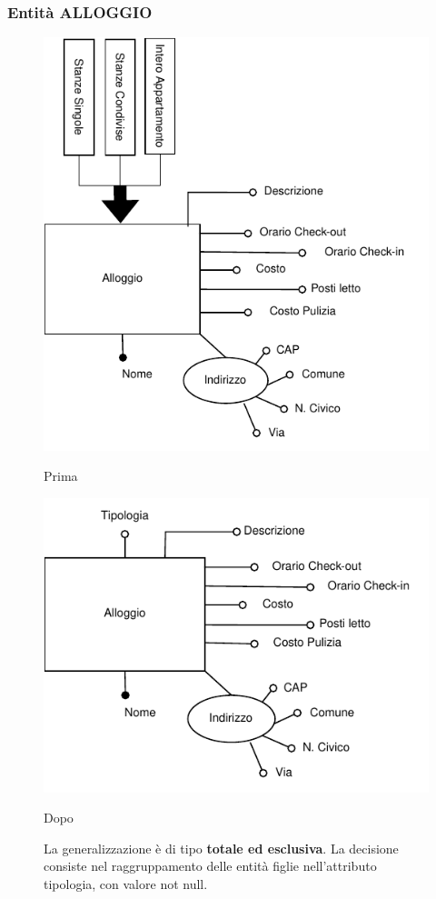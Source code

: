 \subsubsection{Entità ALLOGGIO}
\begin{figure}[H]
      \centering
      \begin{minipage}[b]{0.45\textwidth}
            \includegraphics[width=\textwidth]{resources/pdf/page9.pdf}
            \caption{Prima}
      \end{minipage}
      \hfill
      \begin{minipage}[b]{0.45\textwidth}
            \includegraphics[width=\textwidth]{resources/pdf/page10.pdf}
            \caption{Dopo}
      \end{minipage}
      \caption*{La generalizzazione è di tipo \textbf{totale ed esclusiva}. La decisione consiste nel raggruppamento delle entità	figlie nell'attributo tipologia, con valore not null.}
\end{figure}

